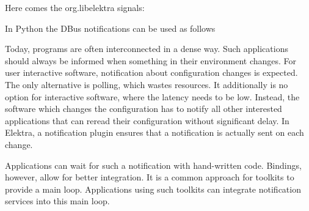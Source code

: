 Here comes the org.\+libelektra signals\+:


\begin{DoxyCode}{0}
\DoxyCodeLine{\{}
\DoxyCodeLine{\};}
\end{DoxyCode}


In Python the D\+Bus notifications can be used as follows


\begin{DoxyCode}{0}
\DoxyCodeLine{}
\DoxyCodeLine{}
\DoxyCodeLine{}
\end{DoxyCode}


Today, programs are often interconnected in a dense way. Such applications should always be informed when something in their environment changes. For user interactive software, notification about configuration changes is expected. The only alternative is polling, which wastes resources. It additionally is no option for interactive software, where the latency needs to be low. Instead, the software which changes the configuration has to notify all other interested applications that can reread their configuration without significant delay. In Elektra, a notification plugin ensures that a notification is actually sent on each change.

Applications can wait for such a notification with hand-\/written code. Bindings, however, allow for better integration. It is a common approach for toolkits to provide a main loop. Applications using such toolkits can integrate notification services into this main loop.

